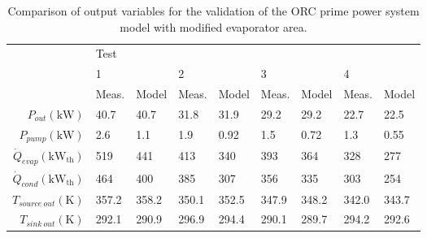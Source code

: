\begin{table}[h]
	\centering
	\caption{Comparison of output variables for the validation of the ORC prime power system model with modified evaporator area.}
	\label{tab:verification_results02}
	\begin{tabular}{rllllllll}
		\toprule
		                                           & Test  &       &       &       &       &       &       &       \\ \cline{2-9}
		                                           & 1     &       & 2     &       & 3     &       & 4     &       \\
		                                           & Meas. & Model & Meas. & Model & Meas. & Model & Meas. & Model \\ \midrule
		                $P_{out}(\si{\kilo\watt})$ & 40.7  & 40.7  & 31.8  & 31.9  & 29.2  & 29.2  & 22.7  & 22.5  \\
		               $P_{pump}(\si{\kilo\watt})$ & 2.6   & 1.1   & 1.9   & 0.92  & 1.5   & 0.72  & 1.3   & 0.55  \\
       $\dot{Q}_{evap}(\si{\kilo\watt}_\text{th})$ & 519   & 441   & 413   & 340   & 393   & 364   & 328   & 277   \\
       $\dot{Q}_{cond}(\si{\kilo\watt}_\text{th})$ & 464   & 400   & 385   & 307   & 356   & 335   & 303   & 254   \\
		           $T_{source\ out}(\si{\kelvin})$ & 357.2 & 358.2 & 350.1 & 352.5 & 347.9 & 348.2 & 342.0 & 343.7 \\
		             $T_{sink\ out}(\si{\kelvin})$ & 292.1 & 290.9 & 296.9 & 294.4 & 290.1 & 289.7 & 294.2 & 292.6 \\ \bottomrule
	\end{tabular}
\end{table}